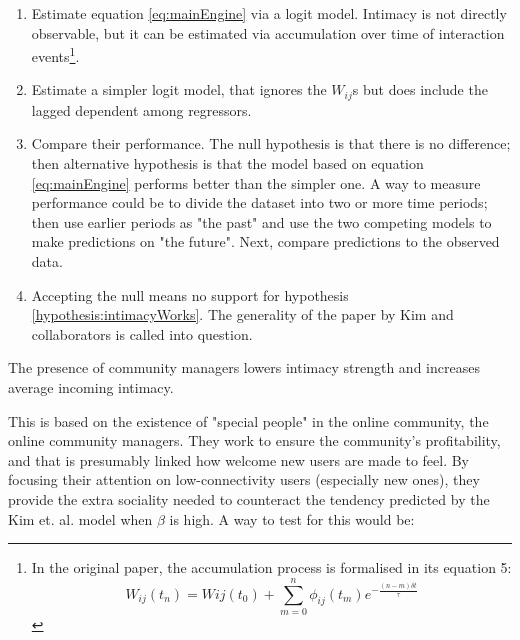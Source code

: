 \documentclass{article}
\begin{document}
\begin{enumerate}
	\item Estimate equation \ref{eq:mainEngine} via a logit model. Intimacy is not directly observable, but it can be estimated via accumulation over time of interaction events\footnote{In the original paper, the accumulation process is formalised in its equation 5:
	\begin{equation}
		W_{ij}(t_n) = W{ij} (t_0) + \displaystyle\sum_{m = 0} ^n \phi_{ij} (t_m) e ^{- \frac{(n-m)\delta t}{\tau}} 
	\end{equation}
	 }. 
	\item Estimate a simpler logit model, that ignores the $W_{ij}$s but does include the lagged dependent among regressors.
	\item Compare their performance. The null hypothesis is that there is no difference; then alternative hypothesis is that the model based on equation \ref{eq:mainEngine} performs better than the simpler one. A way to measure performance could be to divide the dataset into two or more time periods; then use earlier periods as "the past" and use the two competing models to make predictions on "the future". Next, compare predictions to the observed data.
	\item Accepting the null means no support for hypothesis \ref{hypothesis:intimacyWorks}. The generality of the paper by Kim and collaborators is called into question. 
\end{enumerate}

\begin{intimacy}
	The presence of community managers lowers intimacy strength and increases average incoming intimacy.
	\label{hypothesis:commManagersWork}
\end{intimacy}

This is based on the existence of "special people" in the online community, the online community managers. They work to ensure the community's profitability, and that is presumably linked how welcome new users are made to feel. By focusing their attention on low-connectivity users (especially new ones), they provide the extra sociality needed to counteract the tendency predicted by the Kim et. al. model when $\beta$ is high. A way to test for this would be:
\end{document}
